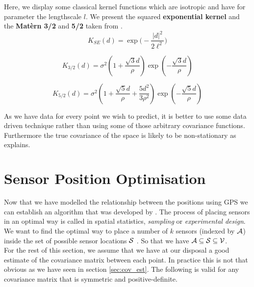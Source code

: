 Here, we display some classical kernel functions which are isotropic and have for parameter the lengthscale $l$. We present the squared \textbf{exponential kernel} and the \textbf{Matèrn 3/2} and \textbf{5/2} taken from \cite{rasmussen_gaussian_2006}. \\


\begin{equation}
	 K_{SE}(d) = \exp \Big(-\frac{|d|^2}{2\ell^2} \Big)
\end{equation}

\begin{equation}
	K_{3/2}(d) = \sigma^2\left(1+\frac{\sqrt{3}d}{\rho}\right)\exp\left(-\frac{\sqrt{3}d}{\rho}\right)
\end{equation} 
 
\begin{equation}
	K_{5/2}(d) = \sigma^2\left(1+\frac{\sqrt{5}d}{\rho}+\frac{5d^2}{3\rho^2}\right)\exp\left(-\frac{\sqrt{5}d}{\rho}\right)
\end{equation}

As we have data for every point we wish to predict, it is better to use some data driven technique rather than using some of those arbitrary covariance functions. Furthermore the true covariance of the space is likely to be non-stationary as \citet{krause_near-optimal_2008} explains. 


\section{Sensor Position Optimisation}\label{sec:theory:opt}

Now that we have modelled the relationship between the positions using GPS we can establish an algorithm that was developed by \citet{krause_near-optimal_2008}. The process of placing sensors in an optimal way is called in spatial statistics, \textit{sampling} or \textit{experimental design}. We want to find the optimal way to place a number of $k$ sensors (indexed by $\A$) inside the set of possible sensor locations $\S$ . So that we have $\A \subseteq \S \subseteq \V$. \\


For the rest of this section, we assume that we have at our disposal a good estimate of the covariance matrix between each point. In practice this is not that obvious as we have seen in section \ref{sec:cov_est}. The following is valid for any covariance matrix that is symmetric and positive-definite. \\ 


